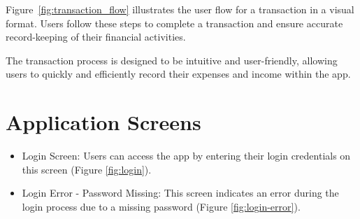 Figure~\ref{fig:transaction_flow} illustrates the user flow for a transaction in a visual format. Users follow these steps to complete a transaction and ensure accurate record-keeping of their financial activities.

The transaction process is designed to be intuitive and user-friendly, allowing users to quickly and efficiently record their expenses and income within the app.

\newpage
\section{Application Screens}
\begin{itemize}
\item Login Screen: Users can access the app by entering their login credentials on this screen (Figure \ref{fig:login}).
\item Login Error - Password Missing: This screen indicates an error during the login process due to a missing password (Figure \ref{fig:login-error}).
\end{itemize}

